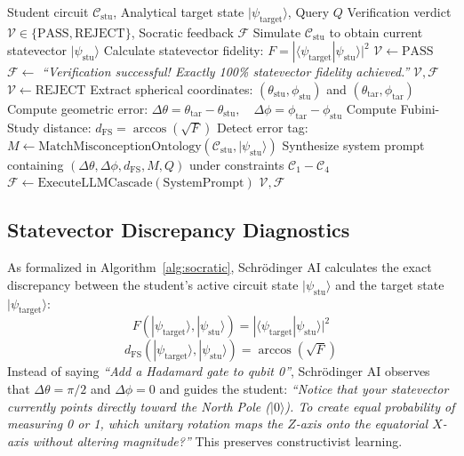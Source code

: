 \documentclass[conference]{IEEEtran}
\begin{document}
\begin{algorithm}[t]
\caption{Schr{\"o}dinger AI Socratic Guidance \& Automated Judge}
\label{alg:socratic}
\begin{algorithmic}[1]
\REQUIRE Student circuit $\mathcal{C}_{\text{stu}}$, Analytical target state $|\psi_{\text{target}}\rangle$, Query $Q$
\ENSURE Verification verdict $\mathcal{V} \in \{\text{PASS}, \text{REJECT}\}$, Socratic feedback $\mathcal{F}$
\STATE Simulate $\mathcal{C}_{\text{stu}}$ to obtain current statevector $|\psi_{\text{stu}}\rangle$
\STATE Calculate statevector fidelity: $F = |\langle \psi_{\text{target}} | \psi_{\text{stu}} \rangle|^2$
    \STATE $\mathcal{V} \leftarrow \text{PASS}$
    \STATE $\mathcal{F} \leftarrow$ \textit{``Verification successful! Exactly 100\% statevector fidelity achieved.''}
    \RETURN $\mathcal{V}, \mathcal{F}$
\ENDIF
\STATE $\mathcal{V} \leftarrow \text{REJECT}$
\STATE Extract spherical coordinates: $(\theta_{\text{stu}}, \phi_{\text{stu}})$ and $(\theta_{\text{tar}}, \phi_{\text{tar}})$
\STATE Compute geometric error: $\Delta\theta = \theta_{\text{tar}} - \theta_{\text{stu}}, \quad \Delta\phi = \phi_{\text{tar}} - \phi_{\text{stu}}$
\STATE Compute Fubini-Study distance: $d_{\text{FS}} = \arccos(\sqrt{F})$
\STATE Detect error tag: $M \leftarrow \text{MatchMisconceptionOntology}(\mathcal{C}_{\text{stu}}, |\psi_{\text{stu}}\rangle)$
\STATE Synthesize system prompt containing $(\Delta\theta, \Delta\phi, d_{\text{FS}}, M, Q)$ under constraints $\mathcal{C}_1-\mathcal{C}_4$
\STATE $\mathcal{F} \leftarrow \text{ExecuteLLMCascade}(\text{SystemPrompt})$
\RETURN $\mathcal{V}, \mathcal{F}$
\end{algorithmic}
\end{algorithm}

\subsection{Statevector Discrepancy Diagnostics}
As formalized in Algorithm~\ref{alg:socratic}, Schr{\"o}dinger AI calculates the exact discrepancy between the student's active circuit state $|\psi_{\text{stu}}\rangle$ and the target state $|\psi_{\text{target}}\rangle$:
\begin{equation}
F(|\psi_{\text{target}}\rangle, |\psi_{\text{stu}}\rangle) = |\langle \psi_{\text{target}} | \psi_{\text{stu}} \rangle|^2
\end{equation}
\begin{equation}
d_{\text{FS}}(|\psi_{\text{target}}\rangle, |\psi_{\text{stu}}\rangle) = \arccos\left(\sqrt{F}\right)
\end{equation}
Instead of saying \textit{``Add a Hadamard gate to qubit 0''}, Schr{\"o}dinger AI observes that $\Delta\theta = \pi/2$ and $\Delta\phi = 0$ and guides the student: \textit{``Notice that your statevector currently points directly toward the North Pole ($|0\rangle$). To create equal probability of measuring 0 or 1, which unitary rotation maps the $Z$-axis onto the equatorial $X$-axis without altering magnitude?''} This preserves constructivist learning.
\end{document}
